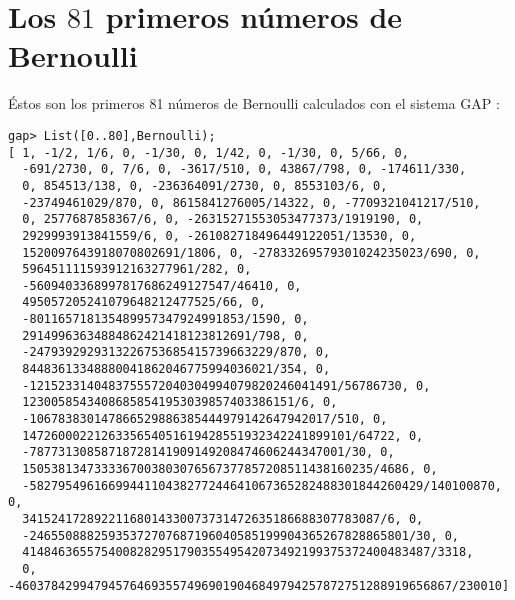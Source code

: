 \chapter{Los $81$ primeros n\'umeros de Bernoulli}

\'Estos son los primeros 81 n\'umeros de Bernoulli calculados con el sistema GAP \cite{GAP}:

\begin{verbatim}
gap> List([0..80],Bernoulli);
[ 1, -1/2, 1/6, 0, -1/30, 0, 1/42, 0, -1/30, 0, 5/66, 0,
  -691/2730, 0, 7/6, 0, -3617/510, 0, 43867/798, 0, -174611/330,
  0, 854513/138, 0, -236364091/2730, 0, 8553103/6, 0,
  -23749461029/870, 0, 8615841276005/14322, 0, -7709321041217/510,
  0, 2577687858367/6, 0, -26315271553053477373/1919190, 0,
  2929993913841559/6, 0, -261082718496449122051/13530, 0,
  1520097643918070802691/1806, 0, -27833269579301024235023/690, 0,
  596451111593912163277961/282, 0,
  -5609403368997817686249127547/46410, 0,
  495057205241079648212477525/66, 0,
  -801165718135489957347924991853/1590, 0,
  29149963634884862421418123812691/798, 0,
  -2479392929313226753685415739663229/870, 0,
  84483613348880041862046775994036021/354, 0,
  -1215233140483755572040304994079820246041491/56786730, 0,
  12300585434086858541953039857403386151/6, 0,
  -106783830147866529886385444979142647942017/510, 0,
  1472600022126335654051619428551932342241899101/64722, 0,
  -78773130858718728141909149208474606244347001/30, 0,
  1505381347333367003803076567377857208511438160235/4686, 0,
  -5827954961669944110438277244641067365282488301844260429/140100870, 0,
  34152417289221168014330073731472635186688307783087/6, 0,
  -24655088825935372707687196040585199904365267828865801/30, 0,
  414846365575400828295179035549542073492199375372400483487/3318,
  0, -4603784299479457646935574969019046849794257872751288919656867/230010]
\end{verbatim}